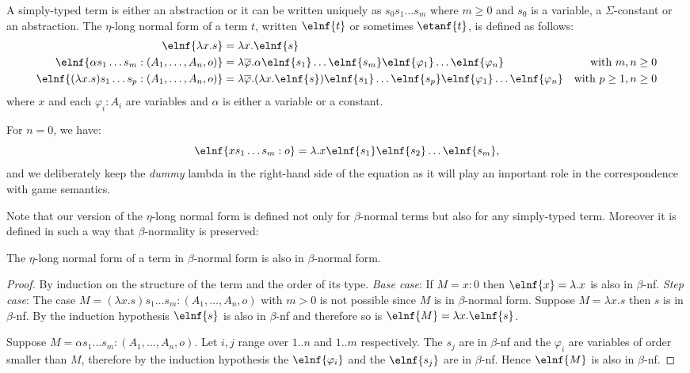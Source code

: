 \begin{definition}
A simply-typed term is either an abstraction or it can be written uniquely as
$s_0 s_1 \ldots s_m$ where $m\geq0$ and $s_0$ is a variable, a $\Sigma$-constant or an abstraction.
The $\eta$-long normal form of a term $t$, written $\elnf{t}$ or sometimes $\etanf{t}$,
is defined as follows:
\begin{align*}
\elnf{\lambda x . s } &= \lambda x . \elnf{s} \\
\elnf{\alpha s_1 \ldots s_m : (A_1,\ldots,A_n,o)} &= \lambda \overline{\varphi} . \alpha \elnf{s_1}\ldots \elnf{s_m} \elnf{\varphi_1} \ldots \elnf{\varphi_n}
& \mbox{with $m,n\geq0$}\\
\elnf{(\lambda x . s) s_1 \ldots s_p : (A_1,\ldots,A_n,o) } &= \lambda \overline{\varphi} . (\lambda x . \elnf{s}) \elnf{s_1} \ldots \elnf{s_p} \elnf{\varphi_1} \ldots \elnf{\varphi_n}
& \mbox{with $p\geq 1,n\geq 0$}
\end{align*}
where $x$ and each $\varphi_i : A_i$ are variables and $\alpha$ is
either a variable or a constant.
\end{definition}

For $n=0$, we have:
$$\elnf{x s_1 \ldots s_m : o} = \lambda . x \elnf{s_1} \elnf{s_2} \ldots \elnf{s_m},$$
and we deliberately keep the \textsl{dummy} lambda in the right-hand
side of the equation as it will play an important role in the
correspondence with game semantics.



Note that our version of the $\eta$-long normal form is defined not only for $\beta$-normal terms but also for any simply-typed term.
Moreover it is defined in such a way that $\beta$-normality is preserved:
\begin{lemma}
The $\eta$-long normal form of a term in $\beta$-normal form is also in $\beta$-normal form.
\end{lemma}
\begin{proof}
By induction on the structure of the term and the order of its type.
\emph{Base case}:
If $M=x:0$ then $\elnf{x} = \lambda . x$ is also in $\beta$-nf.
\emph{Step case}:
The case $M = (\lambda x . s) s_1 \ldots s_m : (A_1,\ldots,A_n,o)$ with $m>0$ is not possible since $M$ is in
$\beta$-normal form.
Suppose $M = \lambda x . s$ then $s$ is in $\beta$-nf. By the induction hypothesis $\elnf{s}$ is also in $\beta$-nf and therefore
so is $\elnf{M} = \lambda x . \elnf{s}$.

Suppose $M= \alpha s_1 \ldots s_m : (A_1,\ldots,A_n,o)$. Let $i,j$
range over $1..n$ and $1..m$ respectively. The $s_j$ are in
$\beta$-nf and the $\varphi_i$ are variables of order smaller than
$M$, therefore by the induction hypothesis the $\elnf{\varphi_i}$ and
the $\elnf{s_j}$ are in $\beta$-nf. Hence $\elnf{M}$ is also in
$\beta$-nf.
\end{proof}

